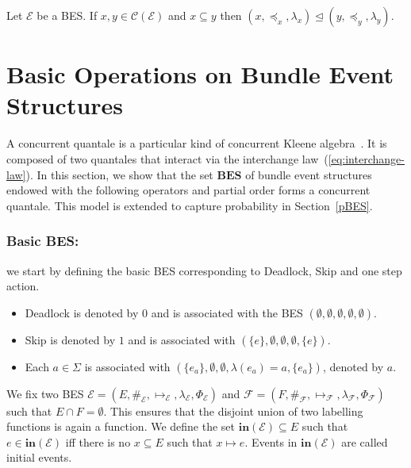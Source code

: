 \documentclass{llncs}
\newcommand{\BES}{\mathbf{BES}}
\newcommand{\C}{\mathcal{C}}
\newcommand{\EE}{\mathcal{E}}
\newcommand{\FF}{\mathcal{F}}
\newcommand{\prefix}{\trianglelefteq}
\newcommand{\init}{\mathbf{in}}
\newcommand{\<}{\langle}
\renewcommand{\>}{\rangle}
\begin{document}
\begin{proposition}\label{pro:configuration-prefix}
Let $\EE$ be a BES. If $x,y\in\C(\EE)$ and $x\subseteq y$ then $(x,\preceq_x,\lambda_x)\prefix (y,\preceq_y,\lambda_y)$.
\end{proposition}

\section{Basic Operations on Bundle Event Structures}\label{operations}

A concurrent quantale is a particular kind of concurrent Kleene  algebra~\cite{Hoa09}. It is composed of two quantales that interact via the interchange law~(\ref{eq:interchange-law}). In this section, we show that the set $\BES$  of bundle event structures endowed with the following operators and partial order forms a concurrent quantale.  This model is extended to capture probability in Section~\ref{pBES}. 
\subsubsection*{Basic BES:} we start by defining the basic BES corresponding to Deadlock, Skip and one step action.
\begin{itemize}
\item Deadlock is denoted by $0$ and is associated with the BES $(\emptyset,\emptyset,\emptyset,\emptyset,\emptyset)$.
\item Skip is denoted by $1$ and is associated with $(\{e\},\emptyset,\emptyset,\emptyset,\{e\})$.
\item Each $a\in\Sigma$ is associated with $(\{e_a\},\emptyset,\emptyset,\lambda(e_a) = a,\{e_a\})$, denoted by $a$.
\end{itemize}


We fix two BES  $\EE = (E,\#_\EE,\mapsto_\EE,\lambda_\EE,\Phi_\EE)$ and $\FF= (F,\#_\FF,\mapsto_\FF,\lambda_\FF,\Phi_\FF)$ such that $E\cap F = \emptyset$. This ensures that the disjoint union of two labelling functions is again a function. We define the set $\init(\EE)\subseteq E$ such that $e\in\init(\EE)$ iff there is no $x\subseteq E$ such that $x\mapsto e$. Events in $\init(\EE)$ are called initial events.
\end{document}
